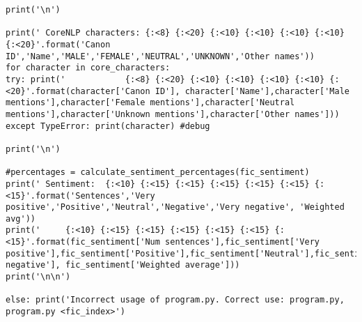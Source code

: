 \documentclass{pre-tfg}
\begin{document}
\begin{lstlisting}[style=consola]
print('\n')

print(' CoreNLP characters:	{:<8} {:<20} {:<10} {:<10} {:<10} {:<10} {:<20}'.format('Canon ID','Name','MALE','FEMALE','NEUTRAL','UNKNOWN','Other names'))
for character in core_characters:
try: print('			{:<8} {:<20} {:<10} {:<10} {:<10} {:<10} {:<20}'.format(character['Canon ID'], character['Name'],character['Male mentions'],character['Female mentions'],character['Neutral mentions'],character['Unknown mentions'],character['Other names']))
except TypeError: print(character) #debug

print('\n')

#percentages = calculate_sentiment_percentages(fic_sentiment)	
print(' Sentiment:	{:<10} {:<15} {:<15} {:<15} {:<15} {:<15} {:<15}'.format('Sentences','Very positive','Positive','Neutral','Negative','Very negative', 'Weighted avg'))
print('		{:<10} {:<15} {:<15} {:<15} {:<15} {:<15} {:<15}'.format(fic_sentiment['Num sentences'],fic_sentiment['Very positive'],fic_sentiment['Positive'],fic_sentiment['Neutral'],fic_sentiment['Negative'],fic_sentiment['Very negative'], fic_sentiment['Weighted average']))
print('\n\n')

else: print('Incorrect usage of program.py. Correct use: program.py, program.py <fic_index>')

\end{lstlisting}
\end{document}
